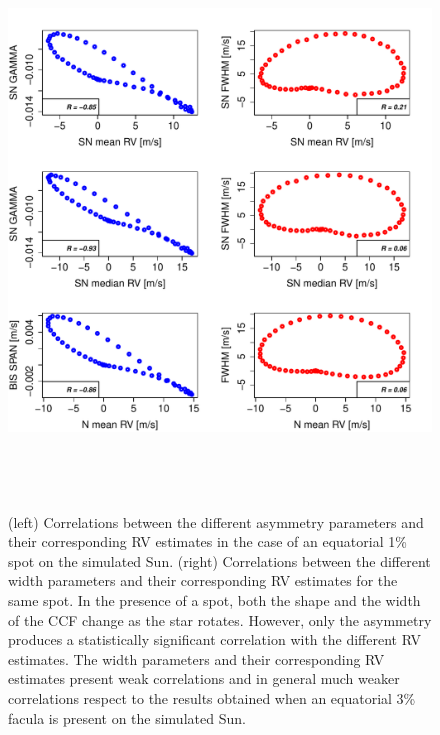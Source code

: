 \documentclass{aa}
\begin{document}
\begin{figure}[htbp]
\begin{center}
\includegraphics[height = 6in]{SOAP_SPOT_Comparison_para_SN.pdf} 
   \caption{(left) Correlations between the different asymmetry parameters and their corresponding RV estimates in the case of an equatorial 1\% spot on the simulated Sun. (right) Correlations between the different width parameters and their corresponding RV estimates for the same spot. In the presence of a spot, both the shape and the width of the CCF change as the star rotates. However, only the asymmetry produces a statistically significant correlation with the different RV estimates. The width parameters and their corresponding RV estimates present weak correlations and in general much weaker correlations respect to the results obtained when an equatorial 3\% facula is present on the simulated Sun.}
    \label{fig:spot.corr}
\end{center}
\end{figure}
\end{document}
